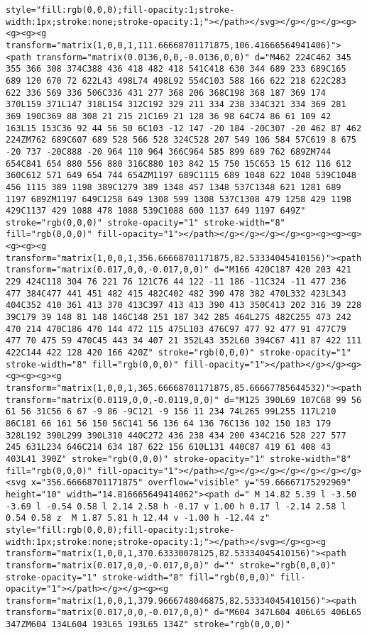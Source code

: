 \documentclass[
]{article}
\begin{document}
\begin{verbatim}
style="fill:rgb(0,0,0);fill-opacity:1;stroke-width:1px;stroke:none;stroke-opacity:1;"></path></svg></g></g></g><g><g><g><g transform="matrix(1,0,0,1,111.66668701171875,106.41666564941406)"><path transform="matrix(0.0136,0,0,-0.0136,0,0)" d="M462 224C462 345 355 366 308 374C388 436 418 482 418 541C418 630 344 689 233 689C165 689 120 670 72 622L43 498L74 498L92 554C103 588 166 622 218 622C283 622 336 569 336 506C336 431 277 368 206 368C198 368 187 369 174 370L159 371L147 318L154 312C192 329 211 334 238 334C321 334 369 281 369 190C369 88 308 21 215 21C169 21 128 36 98 64C74 86 61 109 42 163L15 153C36 92 44 56 50 6C103 -12 147 -20 184 -20C307 -20 462 87 462 224ZM762 689C607 689 528 566 528 324C528 207 549 106 584 57C619 8 675 -20 737 -20C888 -20 964 110 964 366C964 585 899 689 762 689ZM744 654C841 654 880 556 880 316C880 103 842 15 750 15C653 15 612 116 612 360C612 571 649 654 744 654ZM1197 689C1115 689 1048 622 1048 539C1048 456 1115 389 1198 389C1279 389 1348 457 1348 537C1348 621 1281 689 1197 689ZM1197 649C1258 649 1308 599 1308 537C1308 479 1258 429 1198 429C1137 429 1088 478 1088 539C1088 600 1137 649 1197 649Z" stroke="rgb(0,0,0)" stroke-opacity="1" stroke-width="8" fill="rgb(0,0,0)" fill-opacity="1"></path></g></g></g></g><g><g><g><g><g><g><g transform="matrix(1,0,0,1,356.66668701171875,82.53334045410156)"><path transform="matrix(0.017,0,0,-0.017,0,0)" d="M166 420C187 420 203 421 229 424C118 304 76 221 76 121C76 44 122 -11 186 -11C324 -11 477 236 477 384C477 441 451 482 415 482C402 482 390 478 382 470L332 423L343 404C352 410 361 413 370 413C397 413 413 390 413 350C413 202 316 39 228 39C179 39 148 81 148 146C148 251 187 342 285 464L275 482C255 473 242 470 214 470C186 470 144 472 115 475L103 476C97 477 92 477 91 477C79 477 70 475 59 470C45 443 34 407 21 352L43 352L60 394C67 411 87 422 111 422C144 422 128 420 166 420Z" stroke="rgb(0,0,0)" stroke-opacity="1" stroke-width="8" fill="rgb(0,0,0)" fill-opacity="1"></path></g></g><g><g><g><g><g transform="matrix(1,0,0,1,365.66668701171875,85.66667785644532)"><path transform="matrix(0.0119,0,0,-0.0119,0,0)" d="M125 390L69 107C68 99 56 61 56 31C56 6 67 -9 86 -9C121 -9 156 11 234 74L265 99L255 117L210 86C181 66 161 56 150 56C141 56 136 64 136 76C136 102 150 183 179 328L192 390L299 390L310 440C272 436 238 434 200 434C216 528 227 577 245 631L234 646C214 634 187 622 156 610L131 440C87 419 61 408 43 403L41 390Z" stroke="rgb(0,0,0)" stroke-opacity="1" stroke-width="8" fill="rgb(0,0,0)" fill-opacity="1"></path></g></g></g></g></g></g></g><svg x="356.66668701171875" overflow="visible" y="59.66667175292969" height="10" width="14.816665649414062"><path d=" M 14.82 5.39 l -3.50 -3.69 l -0.54 0.58 l 2.14 2.58 h -0.17 v 1.00 h 0.17 l -2.14 2.58 l 0.54 0.58 z  M 1.87 5.81 h 12.44 v -1.00 h -12.44 z" style="fill:rgb(0,0,0);fill-opacity:1;stroke-width:1px;stroke:none;stroke-opacity:1;"></path></svg></g><g><g transform="matrix(1,0,0,1,370.63330078125,82.53334045410156)"><path transform="matrix(0.017,0,0,-0.017,0,0)" d="" stroke="rgb(0,0,0)" stroke-opacity="1" stroke-width="8" fill="rgb(0,0,0)" fill-opacity="1"></path></g></g><g><g transform="matrix(1,0,0,1,379.9666748046875,82.53334045410156)"><path transform="matrix(0.017,0,0,-0.017,0,0)" d="M604 347L604 406L65 406L65 347ZM604 134L604 193L65 193L65 134Z" stroke="rgb(0,0,0)" 
\end{verbatim}
\end{document}
